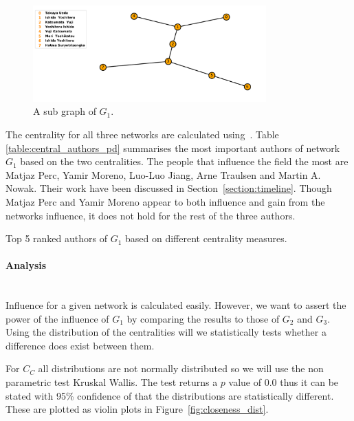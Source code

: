 \documentclass{article}
\theoremstyle{definition}
\begin{document}
\begin{figure}[!hbtp]
    \centering
    \includegraphics[width=0.8\textwidth]{./assets/images/centrality_example.pdf}
    \caption{A sub graph of \(G_1\).}\label{fig:subgraph_t}
\end{figure}

The centrality for all three networks are calculated using~\cite{networkx}. Table
\ref{table:central_authors_pd} summarises the most important authors of network
\(G_1\) based on the two centralities. The people that influence the field the
most are Matjaz Perc, Yamir Moreno, Luo-Luo Jiang, Arne Traulsen and Martin A.
Nowak. Their work have been discussed in Section~\ref{section:timeline}.
Though Matjaz Perc and Yamir Moreno appear to both influence and gain from
the networks influence, it does not hold for the rest of the three authors.

\begin{table}[!hbtp]
    \begin{center}
    \scalebox{0.8}{
    
    }
    \caption{Top 5 ranked authors of \(G_1\) based on different centrality measures.}
    \label{table:central_authors_pd}
    \end{center}
\end{table}

\paragraph{Analysis}
\mbox{ }\\

Influence for a given network is calculated easily. However, we want to assert
the power of the influence of \(G_1\) by comparing the results to those of
\(G_2\) and \(G_3\). Using the distribution of the centralities will we
statistically tests whether a difference does exist between them.

For \(C_C\) all distributions are not normally distributed so we will use the
non parametric test Kruskal Wallis. The test returns a \(p\) value of 0.0 thus 
it can be stated with 95\% confidence of that the distributions are statistically
different. These are plotted as violin plots in Figure~\ref{fig:closeness_dist}.
\end{document}
